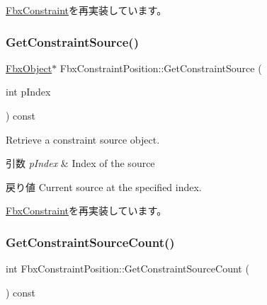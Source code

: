\hyperlink{class_fbx_constraint_a7f587d5db9685b5ee925a85354263edc}{Fbx\+Constraint}を再実装しています。

\mbox{\label{class_fbx_constraint_position_a0024d10c8464eba13d5f3c3037e973cf}} 
\subsubsection{\texorpdfstring{Get\+Constraint\+Source()}{GetConstraintSource()}}
{\footnotesize\ttfamily \hyperlink{class_fbx_object}{Fbx\+Object}$\ast$ Fbx\+Constraint\+Position\+::\+Get\+Constraint\+Source (\begin{DoxyParamCaption}\item[{int}]{p\+Index }\end{DoxyParamCaption}) const\hspace{0.3cm}{\ttfamily [virtual]}}

Retrieve a constraint source object. 
\begin{DoxyParams}{引数}
{\em p\+Index} & Index of the source \\
\hline
\end{DoxyParams}
\begin{DoxyReturn}{戻り値}
Current source at the specified index. 
\end{DoxyReturn}


\hyperlink{class_fbx_constraint_a5ff6fe6fc98af1e33e8b297bc1cea007}{Fbx\+Constraint}を再実装しています。

\mbox{\label{class_fbx_constraint_position_a5f6c49200df6a7a1fe704084c2b56e09}} 
\subsubsection{\texorpdfstring{Get\+Constraint\+Source\+Count()}{GetConstraintSourceCount()}}
{\footnotesize\ttfamily int Fbx\+Constraint\+Position\+::\+Get\+Constraint\+Source\+Count (\begin{DoxyParamCaption}{ }\end{DoxyParamCaption}) const\hspace{0.3cm}{\ttfamily [virtual]}}

